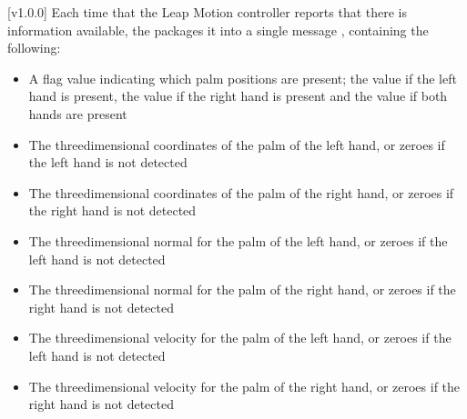[v1.0.0]
Each time that the Leap Motion controller reports that there is information available,
the  packages it into a single message
\openSq{}\closeSq, containing the following:
\begin{itemize}
\item A flag value indicating which palm positions are present; the value  if
the left hand is present, the value  if the right hand is present and the value
 if both hands are present
\item\exSp{}The three\longDash{}dimensional coordinates of the palm of the left hand, or
zeroes if the left hand is not detected
\item\exSp{}The three\longDash{}dimensional coordinates of the palm of the right hand, or
zeroes if the right hand is not detected
\item\exSp{}The three\longDash{}dimensional normal for the palm of the left hand, or
zeroes if the left hand is not detected
\item\exSp{}The three\longDash{}dimensional normal for the palm of the right hand, or
zeroes if the right hand is not detected
\item\exSp{}The three\longDash{}dimensional velocity for the palm of the left hand, or
zeroes if the left hand is not detected
\item\exSp{}The three\longDash{}dimensional velocity for the palm of the right hand, or
zeroes if the right hand is not detected
\end{itemize}
\primaryEnd{}
